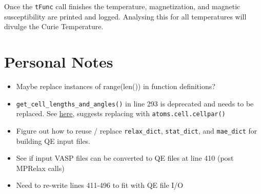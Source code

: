 \documentclass[12pt]{article}
\newcommand{\pmint}[1]{\texttt{#1}}
\begin{document}
Once the \pmint{tFunc} call finishes the temperature, magnetization, and magnetic susceptibility are printed and logged. Analysing this for all temperatures will divulge the Curie Temperature. 

\section*{Personal Notes}
\begin{itemize}
    \item Maybe replace instances of range(len()) in function definitions?
    \item \texttt{get_cell_lengths_and_angles()} in line 293 is deprecated and needs to be replaced. See \href{https://wiki.fysik.dtu.dk/ase/releasenotes.html}{here}, suggests replacing with \texttt{atoms.cell.cellpar()}
    \item Figure out how to reuse / replace \pmint{relax_dict}, \pmint{stat_dict}, and \pmint{mae_dict} for building QE input files. 
    \item See if input VASP files can be converted to QE files at line 410 (post MPRelax calls)
    \item Need to re-write lines 411-496 to fit with QE file I/O
\end{itemize}
\end{document}
